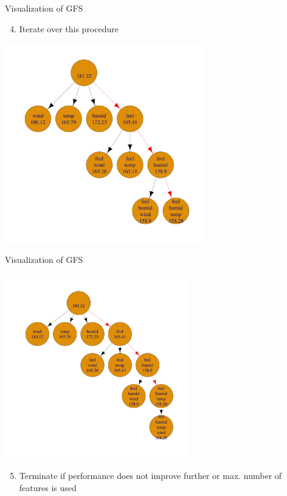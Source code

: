 \documentclass[11pt,compress,t,notes=noshow, xcolor=table]{beamer}
\begin{document}
\begin{frame}[noframenumbering]{Visualization of GFS}
\begin{enumerate}
    \setcounter{enumi}{3}
    \item Iterate over this procedure
\end{enumerate}

    \begin{center}
      \includegraphics[width = 0.65\textwidth]{figure/fs-wrappers-powerset-tree-3.png}
    \end{center}
\end{frame}

\begin{frame}[noframenumbering]{Visualization of GFS}
    \begin{center}
      \includegraphics[width = 0.6\textwidth]{figure/fs-wrappers-powerset-tree-4.png}
      \end{center}
      \vspace{-0.2cm}
 \begin{enumerate}
     \setcounter{enumi}{4}
     \item Terminate if performance does not improve further or max. number of features is used
 \end{enumerate}
\end{frame}
\end{document}
